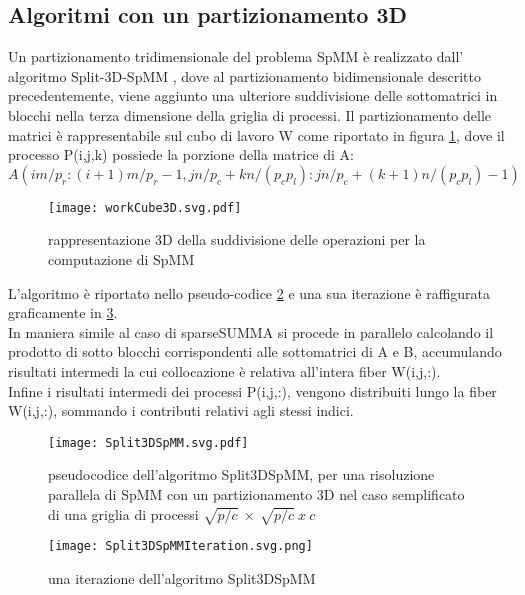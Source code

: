 \subsection{Algoritmi con un partizionamento 3D}
Un partizionamento tridimensionale del problema SpMM è realizzato dall'
algoritmo Split-3D-SpMM \cite{Split3DSpMM}, dove al partizionamento
bidimensionale descritto precedentemente, viene aggiunto una ulteriore
suddivisione delle sottomatrici in blocchi nella terza dimensione della griglia di processi.
Il partizionamento delle matrici è rappresentabile sul cubo di lavoro W come
riportato in figura \ref{fig:workCube3D}, dove il processo P(i,j,k) possiede la
porzione della matrice di A:\\ 
$A(im/p_r:(i+1)m/p_r - 1, jn/p_c + kn/(p_c p_l ) : jn/p_c + (k + 1)n/(p_c p_l) - 1)$  \\
\begin{figure}[H]
  \centering \texttt{[image: workCube3D.svg.pdf]}
  \caption[partizionamento 3D di SpMM]
  {rappresentazione 3D della suddivisione delle operazioni per la computazione di SpMM}
  \decoRule \label{fig:workCube3D}
\end{figure}
L'algoritmo è riportato nello pseudo-codice \ref{figCode:Split3DSpMM} e una
sua iterazione è raffigurata graficamente in \ref{fig:Split3DSpMMIteration}.\\

In maniera simile al caso di sparseSUMMA %
si procede in parallelo calcolando il prodotto di sotto blocchi corrispondenti
alle sottomatrici di A e B, accumulando risultati intermedi la cui collocazione
è relativa all'intera fiber W(i,j,:).\\
Infine i risultati intermedi dei processi P(i,j,:), vengono distribuiti lungo la fiber
W(i,j,:), sommando i contributi relativi agli stessi indici.
\begin{figure}[H] 
  \centering 
  \texttt{[image: Split3DSpMM.svg.pdf]} 
  \caption[pseudocodice Split3DSpMM]{pseudocodice dell'algoritmo Split3DSpMM, 
     per una risoluzione parallela di SpMM con un partizionamento 3D
     nel caso semplificato di una griglia di processi $\sqrt{p/c}~\times~\sqrt{p/c}~x~c$}
  \decoRule \label{figCode:Split3DSpMM}
\end{figure}
\begin{figure}[H]
  \centering \texttt{[image: Split3DSpMMIteration.svg.png]} 
  \caption{una iterazione dell'algoritmo Split3DSpMM}
  \decoRule \label{fig:Split3DSpMMIteration}
\end{figure}
\clearpage

